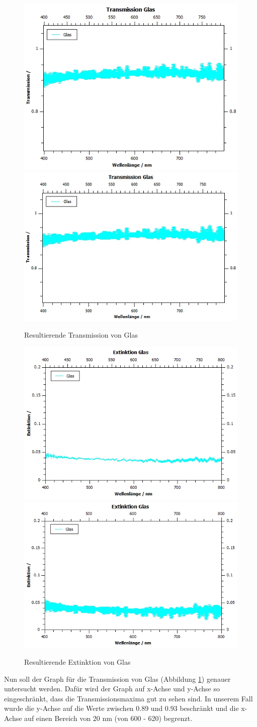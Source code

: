 \documentclass[12pt,a4paper,twoside]{article}
\begin{document}
\begin{figure}[H]
    \centering
    \includegraphics[width=0.4\linewidth]{nudes/qti-Transmission-GlasOU.jpg}
    \includegraphics[width=0.4\linewidth]{nudes/qti-Transmission-Glas.jpg}
    \caption{Resultierende Transmission von Glas}
    \label{fig:TransmissionGlas}
\end{figure}

\begin{figure}[H]
    \centering
    \includegraphics[width=0.4\linewidth]{nudes/qti-Extinktion-GlasOU.jpg}
    \includegraphics[width=0.4\linewidth]{nudes/qti-Extinktion-Glas.jpg}
    \caption{Resultierende Extinktion von Glas}
    \label{fig:ExtinktionGlas}
\end{figure}

\noindent
Nun soll der Graph für die Transmission von Glas (Abbildung \ref{fig:TransmissionGlas}) genauer untersucht werden. 
Dafür wird der Graph auf x-Achse und y-Achse so eingeschränkt, dass die Transmissionsmaxima gut zu sehen sind. In unserem Fall wurde die y-Achse auf die Werte zwischen 0.89 und 0.93 beschränkt und die x-Achse auf einen Bereich von 20 nm (von 600 - 620) begrenzt.
\end{document}
